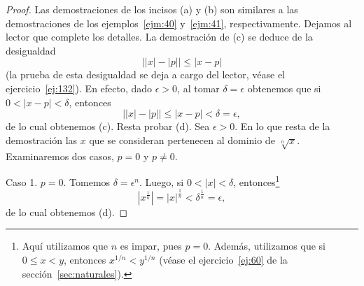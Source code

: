\documentclass[12pt,a4paper]{book}
\begin{document}
    \begin{proof}
        Las demostraciones de los incisos (a) y (b) son similares a las
        demostraciones de los ejemplos~\ref{ejm:40} y~\ref{ejm:41}, respectivamente. Dejamos al lector
        que complete los detalles. La demostración de (c) se deduce de la desigualdad
        \begin{equation*}
            \big||x|-|p|\big|\leq|x-p|
        \end{equation*}
        (la prueba de esta desigualdad se deja a cargo del lector, véase el ejercicio~\ref{ej:132}).
        En efecto, dado $\epsilon>0$, al tomar $\delta=\epsilon$ obtenemos que si $0<|x-p|<\delta$,
        entonces
        \begin{equation*}
            \big||x|-|p|\big|\leq|x-p|<\delta=\epsilon,
        \end{equation*}
        de lo cual obtenemos (c). Resta probar (d). Sea $\epsilon>0$. En lo que resta
        de la demostración las $x$ que se consideran pertenecen al dominio de $\sqrt[n]{x}$.
        Examinaremos dos casos, $p=0$ y $p\neq 0$.

        Caso 1. $p=0$. Tomemos $\delta=\epsilon^{n}$. Luego, si $0<|x|<\delta$, entonces\footnote{Aquí utilizamos que $n$ es impar, pues $p=0$. Además, utilizamos que si $0\leq x<y$,
        entonces $x^{1/n}<y^{1/n}$ (véase el ejercicio~\ref{ej:60} de la sección~\ref{sec:naturales}).}
        \begin{equation*}
            \left|x^{\frac{1}{n}}\right|=|x|^{\frac{1}{n}}<\delta^{\frac{1}{n}}=\epsilon,
        \end{equation*}
        de lo cual obtenemos (d).


\end{proof}
\end{document}
